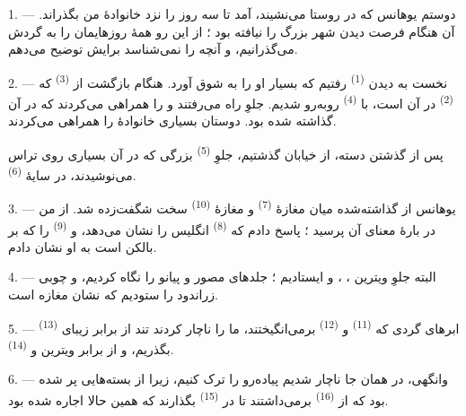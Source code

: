 \VUsaut{4.0mm}
\VUsaut{3.0mm}

\VUsaut{3.0mm}

1. --- دوستم یوهانس که در روستا می‌نشیند، آمد تا سه روز را نزد خانوادهٔ
من بگذراند.  آن هنگام فرصت دیدن شهر بزرگ را نیافته بود ؛ از
این رو همهٔ روزهایمان را به گردش می‌گذرانیم، و آنچه را نمی‌شناسد برایش
توضیح می‌دهم.

2. --- نخست به دیدن  \textsuperscript{(1)} رفتیم که
بسیار او را به شوق آورد. هنگام بازگشت از 
\textsuperscript{(3)} که  \textsuperscript{(2)} در آن
است، با  \textsuperscript{(4)} روبه‌رو شدیم.
جلوِ   راه می‌رفتند و
 را همراهی می‌کردند که  در آن گذاشته شده
بود. دوستان بسیاری خانوادهٔ  را همراهی می‌کردند.

پس از گذشتن دسته، از خیابان گذشتیم، جلوِ 
\textsuperscript{(5)} بزرگی که در آن  بسیاری روی تراس
 می‌نوشیدند، در سایهٔ 
\textsuperscript{(6)}.

3. --- یوهانس از  گذاشته‌شده میان مغازهٔ
 \textsuperscript{(7)} و مغازهٔ 
\textsuperscript{(10)} سخت شگفت‌زده شد. از من در بارهٔ معنای آن پرسید ؛
پاسخ دادم که  \textsuperscript{(8)} انگلیس را نشان
می‌دهد، و  \textsuperscript{(9)} را که بر بالکن است به او
نشان دادم.

\VUsaut{3.0mm}

4. --- البته جلوِ ویترین ،
،  و  ایستادیم ؛
جلدهای مصور  و  پیانو را
نگاه کردیم، و  چوبی زراندود را ستودیم که نشان مغازه است.

5. --- ابرهای گردی که  \textsuperscript{(11)} و
 \textsuperscript{(12)} برمی‌انگیختند، ما را ناچار
کردند تند از برابر  زیبای 
\textsuperscript{(13)} بگذریم، و از برابر ویترین  و
  \textsuperscript{(14)}.

6. --- وانگهی، در همان جا ناچار شدیم پیاده‌رو را ترک کنیم، زیرا از
بسته‌هایی پر شده بود که از  \textsuperscript{(16)}
برمی‌داشتند تا در  \textsuperscript{(15)} بگذارند که همین
حالا اجاره شده بود.

